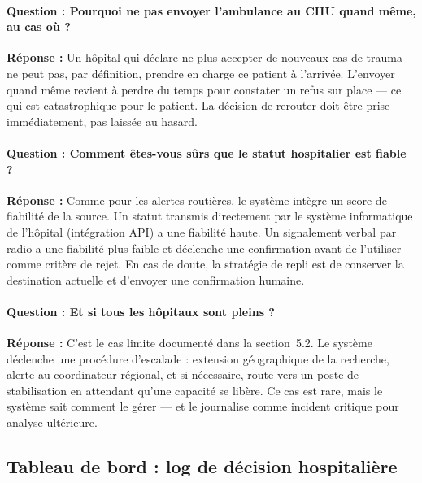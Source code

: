 \documentclass[12pt,a4paper]{article}
\theoremstyle{definition}
\theoremstyle{remark}
\begin{document}
\paragraph{Question : \og{}Pourquoi ne pas envoyer l'ambulance au CHU
quand même, au cas où ?\fg{}}

\noindent\textbf{Réponse :} Un hôpital qui déclare ne plus accepter
de nouveaux cas de trauma ne peut pas, par définition, prendre en
charge ce patient à l'arrivée. L'envoyer quand même revient à perdre
du temps pour constater un refus sur place — ce qui est catastrophique
pour le patient. La décision de rerouter doit être prise immédiatement,
pas laissée au hasard.

\paragraph{Question : \og{}Comment êtes-vous sûrs que le statut
hospitalier est fiable ?\fg{}}

\noindent\textbf{Réponse :} Comme pour les alertes routières, le
système intègre un score de fiabilité de la source. Un statut
transmis directement par le système informatique de l'hôpital
(intégration API) a une fiabilité haute. Un signalement verbal
par radio a une fiabilité plus faible et déclenche une confirmation
avant de l'utiliser comme critère de rejet. En cas de doute, la
stratégie de repli est de conserver la destination actuelle et
d'envoyer une confirmation humaine.

\paragraph{Question : \og{}Et si tous les hôpitaux sont pleins ?\fg{}}

\noindent\textbf{Réponse :} C'est le cas limite documenté dans
la section~5.2. Le système déclenche une procédure d'escalade :
extension géographique de la recherche, alerte au coordinateur
régional, et si nécessaire, route vers un poste de stabilisation
en attendant qu'une capacité se libère. Ce cas est rare, mais le
système sait comment le gérer — et le journalise comme incident
critique pour analyse ultérieure.

\subsection{Tableau de bord : log de décision hospitalière}
\end{document}
